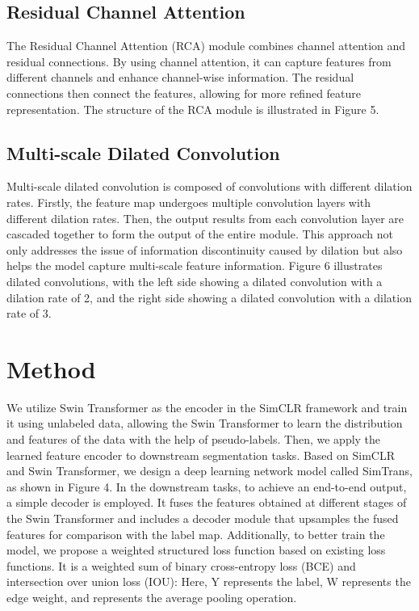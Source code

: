 \documentclass[10pt,twocolumn,letterpaper]{article}
\begin{document}

\subsection{Residual Channel Attention}

The Residual Channel Attention (RCA) module combines channel attention and residual connections. By using channel attention, it can capture features from different channels and enhance channel-wise information. The residual connections then connect the features, allowing for more refined feature representation. The structure of the RCA module is illustrated in Figure 5.


\subsection{Multi-scale Dilated Convolution}

Multi-scale dilated convolution is composed of convolutions with different dilation rates. Firstly, the feature map undergoes multiple convolution layers with different dilation rates. Then, the output results from each convolution layer are cascaded together to form the output of the entire module. This approach not only addresses the issue of information discontinuity caused by dilation but also helps the model capture multi-scale feature information. Figure 6 illustrates dilated convolutions, with the left side showing a dilated convolution with a dilation rate of 2, and the right side showing a dilated convolution with a dilation rate of 3.


\section{Method}
\label{sec:method}

We utilize Swin Transformer as the encoder in the SimCLR framework and train it using unlabeled data, allowing the Swin Transformer to learn the distribution and features of the data with the help of pseudo-labels. Then, we apply the learned feature encoder to downstream segmentation tasks. Based on SimCLR and Swin Transformer, we design a deep learning network model called SimTrans, as shown in Figure 4. In the downstream tasks, to achieve an end-to-end output, a simple decoder is employed. It fuses the features obtained at different stages of the Swin Transformer and includes a decoder module that upsamples the fused features for comparison with the label map. Additionally, to better train the model, we propose a weighted structured loss function based on existing loss functions. It is a weighted sum of binary cross-entropy loss (BCE) and intersection over union loss (IOU):
Here, Y represents the label, W represents the edge weight, and represents the average pooling operation.
\end{document}
